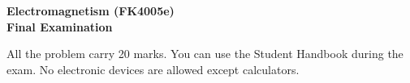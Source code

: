 \documentclass[a4paper,twoside,10pt]{article}
\begin{document}

\newenvironment{itmz}%
{ \vspace{-\parskip} \begin{itemize} }%
{ \end{itemize} }
\def\flux{{\cal F}_\nu}


\begin{center}
  {\Large \bf
   Electromagnetism (FK4005e)\\[2mm]
   Final Examination} \\[4mm]
\end{center}
All the problem carry 20 marks.  
You can use the Student Handbook during the exam. No electronic devices are allowed
except calculators. 
\bigskip

\end{document}

